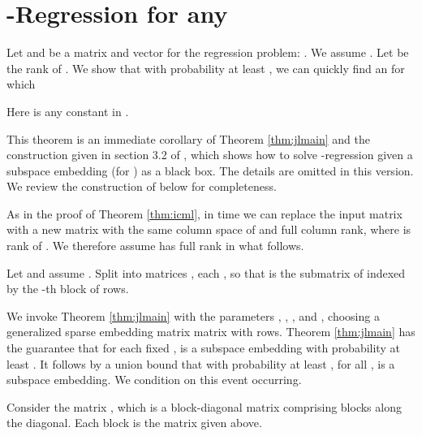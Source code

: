 \documentclass{sig-alternate}
\begin{document}
\section{-Regression for any } \label{sec: ell_p}
Let  and  be a matrix and
vector for the regression problem: . We assume . 
Let  be the rank of . 
We show that with probability at least , 
we can quickly find an  for which

Here  is any constant in . 

This theorem is an immediate corollary of Theorem \ref{thm:jlmain} 
and the construction given in 
section 3.2 of \cite{CDMMMW}, which shows how to solve -regression given a subspace embedding
(for ) as a black box.
\ifSTOC
The details are omitted in this version.
\else
We review the construction of \cite{CDMMMW} below for completeness. 

As in the proof of Theorem \ref{thm:icml}, in  time we can 
replace the input matrix  with a new matrix with the same column space of  and 
full column rank,
where  is rank of . We therefore assume  has full rank in what follows. 

Let  and assume . 
Split  into  matrices ,
each , so that  is the submatrix of  indexed by the -th block of 
 rows. 

We invoke Theorem \ref{thm:jlmain} with the parameters , , , 
and , choosing a generalized sparse embedding matrix matrix  with 
 rows. Theorem \ref{thm:jlmain} has the guarantee that for each fixed ,
 is a subspace embedding with probability at least . It follows by a union
bound that with probability at least , for all ,  
is a subspace embedding. We condition on this event occurring. 

Consider the matrix
, which 
is a block-diagonal matrix comprising  blocks along the diagonal.
Each block is the  matrix  given above. 
\end{document}

